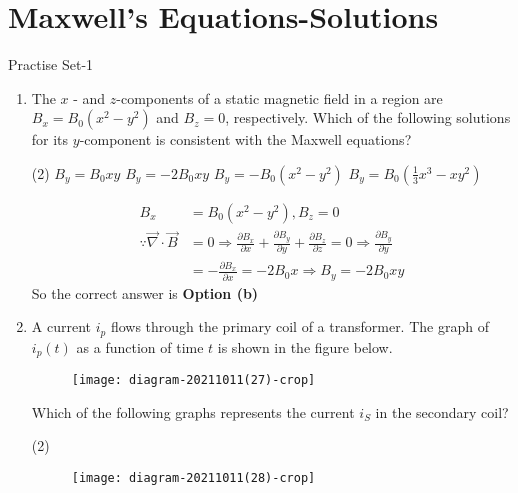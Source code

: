 \chapter{Maxwell's Equations-Solutions}
\begin{abox}
	Practise Set-1
\end{abox}
\begin{enumerate}
	\item The $x$ - and $z$-components of a static magnetic field in a region are $B_{x}=B_{0}\left(x^{2}-y^{2}\right)$ and $B_{z}=0$, respectively. Which of the following solutions for its $y$-component is consistent with the Maxwell equations?
	{}
	\begin{tasks}(2)
		\task[\textbf{a.}]$B_{y}=B_{0} x y$
		\task[\textbf{b.}]$B_{y}=-2 B_{0} x y$
		\task[\textbf{c.}] $B_{y}=-B_{0}\left(x^{2}-y^{2}\right)$
		\task[\textbf{d.}]  $B_{y}=B_{0}\left(\frac{1}{3} x^{3}-x y^{2}\right)$
	\end{tasks}
\begin{answer}
	\begin{align*}
	B_{x}&=B_{0}\left(x^{2}-y^{2}\right), B_{z}=0\\
	\because \vec{\nabla} \cdot \vec{B}&=0 \Rightarrow \frac{\partial B_{x}}{\partial x}+\frac{\partial B_{y}}{\partial y}+\frac{\partial B_{z}}{\partial z}=0 \Rightarrow \frac{\partial B_{y}}{\partial y}\\&=-\frac{\partial B_{x}}{\partial x}=-2 B_{0} x \Rightarrow B_{y}=-2 B_{0} x y
	\end{align*}
	So the correct answer is \textbf{Option (b)}
\end{answer}
	\item A current $i_{p}$ flows through the primary coil of a transformer. The graph of $i_{p}(t)$ as a function of time $t$ is shown in the figure below.\\
	\begin{figure}[H]
		\centering
		\texttt{[image: diagram-20211011(27)-crop]}
	\end{figure}
	Which of the following graphs represents the current $i_{S}$ in the secondary coil?
	{}
	\begin{tasks}(2)
		\task[\textbf{a.}] \begin{figure}[H]
			\centering
			\texttt{[image: diagram-20211011(28)-crop]}
		\end{figure}
		\task[\textbf{b.}] \begin{figure}[H]
			\centering

\end{figure}
\end{tasks}
\end{enumerate}

